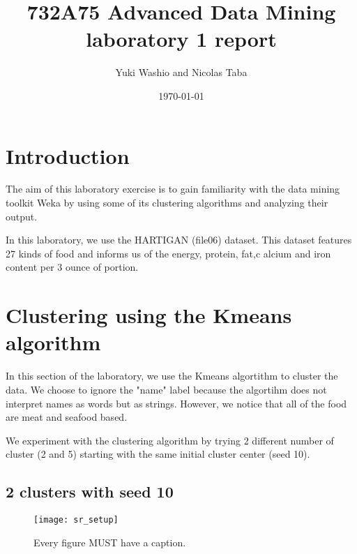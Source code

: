 \documentclass[letterpaper,12pt]{article}
\begin{document}
\title{732A75 Advanced Data Mining laboratory 1 report}
\author{Yuki Washio and Nicolas Taba}
\date{\today}
\maketitle



\section{Introduction}

The aim of this laboratory exercise is to gain familiarity with the data mining toolkit Weka by using some of its clustering algorithms and analyzing their output.

In this laboratory, we use the HARTIGAN (file06) dataset. This dataset features 27 kinds of food and informs us of the energy, protein, fat,c alcium and iron content per 3 ounce of portion.


\section{Clustering using the Kmeans algorithm}

In this section of the laboratory, we use the Kmeans algortithm to cluster the data. We choose to ignore the "name" label because the algortihm does not interpret names as words but as strings. However, we notice that all of the food are meat and seafood based.

We experiment with the clustering algorithm by trying 2 different number of cluster (2 and 5) starting with the same initial cluster center (seed 10).

\subsection{2 clusters with seed 10}

\begin{figure}[ht] 
        \centering \texttt{[image: sr\_setup]}
        \caption{
                \label{fig:samplesetup} %
                Every figure MUST have a caption.
        }
\end{figure}
\end{document}
